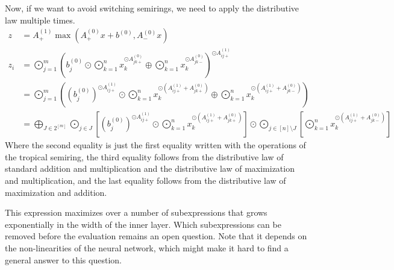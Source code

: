 Now, if we want to avoid switching semirings, we need to apply the distributive law multiple times.
\begin{align*}
    z   & = A^{(1)}_+ \max(A^{(0)}_+ x + b^{(0)}, A^{(0)}_- x)                                                                                                                                                                                                                                                                                                          \\
    z_i & = \bigodot\limits_{j = 1}^{m}\left(b^{(0)}_j \odot \bigodot\limits_{k = 1}^{n} x_k^{\odot A^{(0)}_{jk+}} \oplus \bigodot\limits_{k = 1}^{n} x_k^{\odot A^{(0)}_{jk-}}\right)^{\odot A^{(1)}_{ij+}}                                                                                                                                                            \\
        & = \bigodot\limits_{j = 1}^{m}\left(\left(b^{(0)}_j\right)^{\odot A^{(1)}_{ij+}} \odot \bigodot\limits_{k = 1}^{n} x_k^{\odot \left(A^{(1)}_{ij+} + A^{(0)}_{jk+}\right)} \oplus \bigodot\limits_{k = 1}^{n} x_k^{\odot \left(A^{(1)}_{ij+} + A^{(0)}_{jk-}\right)}\right)                                                                                     \\
        & = \bigoplus\limits_{J \in 2^{[m]}} \bigodot\limits_{j \in J} \left[\left(b^{(0)}_j\right)^{\odot A^{(1)}_{ij+}} \odot \bigodot\limits_{k = 1}^{n} x_k^{\odot \left(A^{(1)}_{ij+} + A^{(0)}_{jk+}\right)}\right] \odot \bigodot\limits_{j \in [n] \setminus J} \left[\bigodot\limits_{k = 1}^{n} x_k^{\odot \left(A^{(1)}_{ij+} + A^{(0)}_{jk-}\right)}\right]
\end{align*}
Where the second equality is just the first equality written with the operations of the tropical semiring,
the third equality follows from the distributive law of standard addition and multiplication and the distributive law of maximization and multiplication,
and the last equality follows from the distributive law of maximization and addition.

This expression maximizes over a number of subexpressions that grows exponentially in the width of the inner layer.
Which subexpressions can be removed before the evaluation remains an open question.
Note that it depends on the non-linearities of the neural network, which might make it hard to find a general answer to this question.

